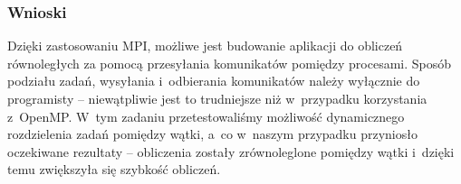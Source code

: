 \documentclass[a4paper,12pt]{article}
\begin{document}
\subsubsection*{Wnioski}
\noindent Dzięki zastosowaniu MPI, możliwe jest budowanie aplikacji do obliczeń równoległych za pomocą przesyłania komunikatów pomiędzy procesami. Sposób podziału zadań, wysyłania i~odbierania komunikatów należy wyłącznie do programisty -- niewątpliwie jest to trudniejsze niż w~przypadku korzystania z~OpenMP. W~tym zadaniu przetestowaliśmy możliwość dynamicznego rozdzielenia zadań pomiędzy wątki, a~co w~naszym przypadku przyniosło oczekiwane rezultaty -- obliczenia zostały zrównoleglone pomiędzy wątki i~dzięki temu zwiększyła się szybkość obliczeń.
\end{document}
